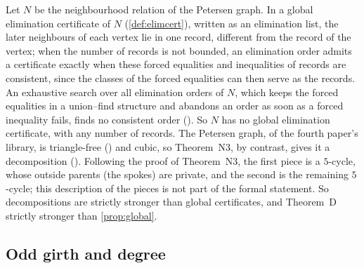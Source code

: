 \begin{remark}\label{rem:petersen}
Let $N$ be the neighbourhood relation of the Petersen graph. In a global elimination certificate of $N$
(\cref{def:elimcert}), written as an elimination list, the later neighbours of each vertex lie in one record, different
from the record of the vertex; when the number of records is not bounded, an elimination order admits a certificate
exactly when these forced equalities and inequalities of records are consistent, since the classes of the forced
equalities can then serve as the records. An exhaustive search over all elimination orders of $N$, which keeps the
forced equalities in a union--find structure and abandons an order as soon as a forced inequality fails, finds no
consistent order (). So $N$ has no global elimination certificate, with any number of
records. The Petersen graph,  of the fourth paper's library, is triangle-free
() and cubic, so Theorem~N3, by contrast, gives it a decomposition ().
Following the proof of Theorem~N3, the first piece is a $5$-cycle, whose outside parents (the spokes) are private, and the
second is the remaining $5$-cycle; this description of the pieces is not part of the formal statement. So
decompositions are strictly stronger than global certificates, and Theorem~D strictly stronger than
\cref{prop:global}.
\end{remark}

\subsection{Odd girth and degree}\label{sec:foldcubes}

